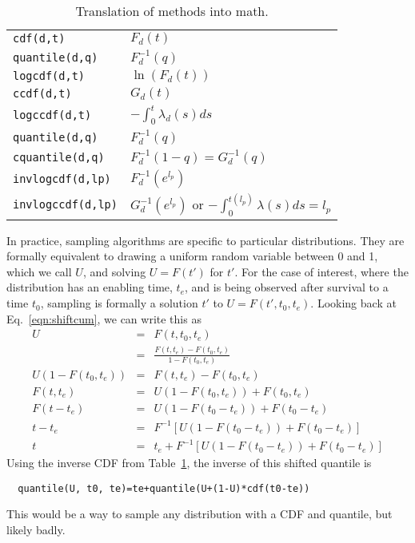 \documentclass{article}
\newcommand{\code}[1]{\texttt{#1}}
\begin{document}
\begin{table}
\begin{tabular}{ll} \hline
\code{cdf(d,t)} & $F_d(t)$ \\
\code{quantile(d,q)} & $F_d^{-1}(q)$ \\
\code{logcdf(d,t)} & $\ln(F_d(t))$ \\
\code{ccdf(d,t)} & $G_d(t)$ \\
\code{logccdf(d,t)} & $-\int_0^t \lambda_d(s)ds$ \\
\code{quantile(d,q)} & $F_d^{-1}(q)$ \\
\code{cquantile(d,q)} & $F_d^{-1}(1-q)=G_d^{-1}(q)$ \\
\code{invlogcdf(d,lp)} & $F_d^{-1}(e^{l_p})$ \\
\code{invlogccdf(d,lp)} & $G_d^{-1}(e^{l_p})$ or $-\int_0^{t(l_p)}\lambda(s)ds=l_p$ \\\hline
\end{tabular}
\caption{Translation of methods into math.\label{fig:methodmath}}
\end{table}

In practice, sampling algorithms are specific to particular distributions.
They are formally equivalent to drawing a uniform random variable between
0 and 1, which we call $U$, and solving $U=F(t')$ for $t'$.
For the case of interest, where the distribution has an enabling time, $t_e$,
and is being observed after survival to a time $t_0$, sampling is formally
a solution $t'$ to $U=F(t', t_0, t_e)$. Looking back at Eq.~\ref{eqn:shiftcum},
we can write this as
\begin{eqnarray}
 U&=&F(t,t_0,t_e) \\
  &=&\frac{F(t,t_e)-F(t_0,t_e)}{1-F(t_0,t_e)} \\
U(1-F(t_0,t_e))&=&F(t,t_e)-F(t_0,t_e) \\
F(t,t_e)&=&U(1-F(t_0,t_e))+F(t_0,t_e) \\
F(t-t_e)&=&U(1-F(t_0-t_e))+F(t_0-t_e) \\
t-t_e &=& F^{-1}\left[U(1-F(t_0-t_e))+F(t_0-t_e)\right] \\
t &=& t_e+F^{-1}\left[U(1-F(t_0-t_e))+F(t_0-t_e)\right]
\end{eqnarray}
Using the inverse \textsc{CDF} from Table~\ref{fig:methodmath},
the inverse of this shifted quantile is
\begin{lstlisting}
  quantile(U, t0, te)=te+quantile(U+(1-U)*cdf(t0-te))
\end{lstlisting}
This would be a way to sample any distribution with a \textsc{CDF} and
quantile, but likely badly.
\end{document}
